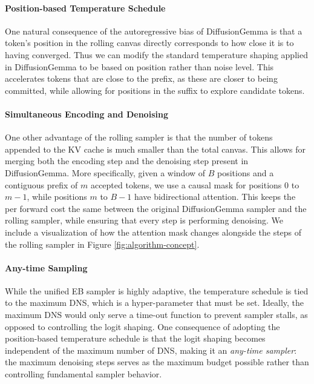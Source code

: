 \paragraph{Position-based Temperature Schedule}
One natural consequence of the autoregressive bias of DiffusionGemma is that a token's position in the rolling canvas directly corresponds to how close it is to having converged. 
Thus we can modify the standard temperature shaping applied in DiffusionGemma to be based on position rather than noise level. 
This accelerates tokens that are close to the prefix, as these are closer to being committed, while allowing for positions in the suffix to explore candidate tokens.

\paragraph{Simultaneous Encoding and Denoising}
One other advantage of the rolling sampler is that the number of tokens appended to the KV cache is much smaller than the total canvas. This allows for merging both the encoding step and the denoising step present in DiffusionGemma. 
More specifically, given a window of $B$ positions and a contiguous prefix of $m$ accepted tokens, we use a causal mask for positions $0$ to $m-1$, while positions $m$ to $B-1$ have bidirectional attention.
This keeps the per forward cost the same between the original DiffusionGemma sampler and the rolling sampler, while ensuring that every step is performing denoising. 
We include a visualization of how the attention mask changes alongside the steps of the rolling sampler in Figure \ref{fig:algorithm-concept}. 

\paragraph{Any-time Sampling}
While the unified EB sampler is highly adaptive, the temperature schedule is tied to the maximum DNS, which is a hyper-parameter that must be set. 
Ideally, the maximum DNS would only serve a time-out function to prevent sampler stalls, as opposed to controlling the logit shaping.
One consequence of adopting the position-based temperature schedule is that the logit shaping becomes independent of the maximum number of DNS, making it an \textit{any-time sampler}: the maximum denoising steps serves as the maximum budget possible rather than controlling fundamental sampler behavior.
